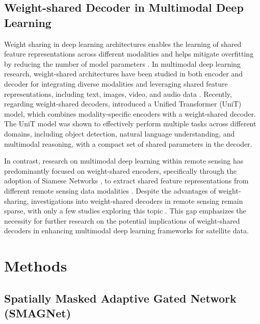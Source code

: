 \documentclass[preprint,12pt,authoryear]{elsarticle}
\begin{document}
\subsection{Weight-shared Decoder in Multimodal Deep Learning}
\label{Section2.4}

Weight sharing in deep learning architectures enables the learning of shared feature representations across different modalities and helps mitigate overfitting by reducing the number of model parameters \citep{ott2020learning}. In multimodal deep learning research, weight-shared architectures have been studied in both encoder and decoder for integrating diverse modalities and leveraging shared feature representations, including text, images, video, and audio data \citep{hickson2022sharing, ngiam2011multimodal, xu2023spnet}. Recently, regarding weight-shared decoders, \cite{hu2021unit} introduced a Unified Transformer (UniT) model, which combines modality-specific encoders with a weight-shared decoder. The UniT model was shown to effectively perform multiple tasks across different domains, including object detection, natural language understanding, and multimodal reasoning, with a compact set of shared parameters in the decoder.

In contrast, research on multimodal deep learning within remote sensing has predominantly focused on weight-shared encoders, specifically through the adoption of Siamese Networks \citep{chopra2005learning}, to extract shared feature representations from different remote sensing data modalities \citep{ge2022improved, lei2022boundary, liu2019siamese, yin2023attention}. Despite the advantages of weight-sharing, investigations into weight-shared decoders in remote sensing remain sparse, with only a few studies exploring this topic \citep{qu2018unsupervised}. This gap emphasizes the necessity for further research on the potential implications of weight-shared decoders in enhancing multimodal deep learning frameworks for satellite data.

\section{Methods}
\label{Section3}

\subsection{Spatially Masked Adaptive Gated Network (SMAGNet)}
\label{Section3.1}
\end{document}
